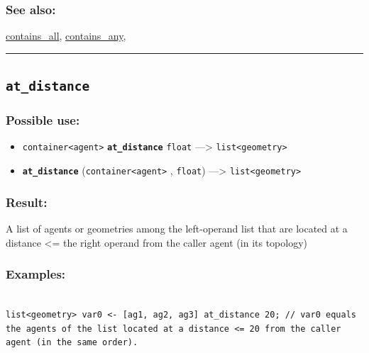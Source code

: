 \documentclass[]{book}
\providecommand{\tightlist}{%
  \setlength{\itemsep}{0pt}\setlength{\parskip}{0pt}}
\theoremstyle{definition}
\theoremstyle{definition}
\theoremstyle{definition}
\theoremstyle{remark}
\begin{document}
\subsubsection{See also:}\label{see-also-39}

\href{operators-b-to-c.html\#contains_all}{contains\_all},
\href{operators-b-to-c.html\#contains_any}{contains\_any},

\begin{center}\rule{0.5\linewidth}{\linethickness}\end{center}

\subsection{\texorpdfstring{\texttt{at\_distance}}{at\_distance}}\label{at_distance}

\subsubsection{Possible use:}\label{possible-use-57}

\begin{itemize}
\tightlist
\item
  \texttt{container\textless{}agent\textgreater{}}
  \textbf{\texttt{at\_distance}} \texttt{float} ---\textgreater{}
  \texttt{list\textless{}geometry\textgreater{}}
\item
  \textbf{\texttt{at\_distance}}
  (\texttt{container\textless{}agent\textgreater{}} , \texttt{float})
  ---\textgreater{} \texttt{list\textless{}geometry\textgreater{}}
\end{itemize}

\subsubsection{Result:}\label{result-56}

A list of agents or geometries among the left-operand list that are
located at a distance \textless{}= the right operand from the caller
agent (in its topology)

\subsubsection{Examples:}\label{examples-47}

\begin{verbatim}
 
list<geometry> var0 <- [ag1, ag2, ag3] at_distance 20; // var0 equals the agents of the list located at a distance <= 20 from the caller agent (in the same order).
\end{verbatim}
\end{document}
